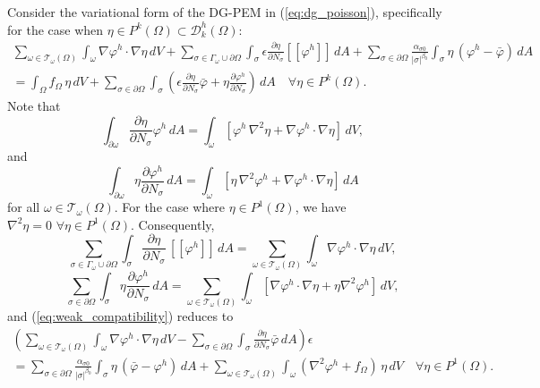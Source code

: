	Consider the variational form of the DG-PEM in (\ref{eq:dg_poisson}), specifically for the case when $\eta \in P^k (\Omega) \subset \mathcal{D}^h_k (\Omega)$:
	\begin{eqnarray}
		\sum_{\omega \in \mathcal{T}_\omega (\Omega)} \int_{\omega} \nabla \varphi^h \cdot \nabla \eta \, dV 
		+ \sum_{\sigma \in \Gamma_\omega \cup \partial \Omega} \int_{\sigma} \epsilon \frac{\partial \eta}{\partial N_{\sigma}} [\![ \varphi^h ]\!] \, dA
		+ \sum_{\sigma \in \partial \Omega} \frac{\alpha_{\sigma0}}{|\sigma|^{\beta_0}} \int_{\sigma} \eta \, (\varphi^h - \bar{\varphi}) \, dA \nonumber \\ 
		= \int_{\Omega} f_{\Omega} \, \eta \, dV + \sum_{\sigma \in \partial \Omega} \int_{\sigma} \left( \epsilon \frac{\partial \eta}{\partial N_{\sigma}} \bar{\varphi} + \eta \frac{\partial \varphi^h}{\partial N_{\sigma}} \right) \, dA \quad \forall \eta \in P^k (\Omega).
		\label{eq:weak_compatibility}
	\end{eqnarray}
Note that
\begin{equation}
	\int_{\partial \omega} \frac{\partial \eta}{\partial N_{\sigma}} \varphi^h \, dA = \int_{\omega} \left[ \varphi^h \, \nabla^2 \eta  + \nabla \varphi^h \cdot \nabla \eta \right] \, dV,
\end{equation}
and
\begin{equation}
	\int_{\partial \omega} \eta \frac{\partial \varphi^h}{\partial N_{\sigma}} \, dA = \int_{\omega} \left[ \eta \, \nabla^2 \varphi^h + \nabla \varphi^h \cdot \nabla \eta \right] \, dA
\end{equation}
for all $\omega \in \mathcal{T}_\omega (\Omega)$. For the case where $\eta \in P^1 (\Omega)$, we have $\nabla^2 \eta = 0 \, \, \forall \eta \in P^1 (\Omega)$. Consequently,
	\begin{equation}
	\sum_{\sigma \in \Gamma_\omega \cup \partial \Omega} \int_{\sigma} \frac{\partial \eta}{\partial N_{\sigma}} \, [\![ \varphi^h ]\!] \, dA = \sum_{\omega \in \mathcal{T}_\omega (\Omega)} \int_{\omega} \nabla \varphi^h \cdot \nabla \eta \, dV,
	\end{equation}
	\begin{equation}
	 \sum_{\sigma \in \partial \Omega} \int_{\sigma} \eta \frac{\partial \varphi^h}{\partial N_{\sigma}} \, dA = \sum_{\omega \in \mathcal{T}_\omega (\Omega)} \int_{\omega} \left[ \nabla \varphi^h \cdot \nabla \eta + \eta \nabla^2 \varphi^h \right] \, dV,
	\end{equation}
and (\ref{eq:weak_compatibility}) reduces to
	\begin{eqnarray}
		\left( \sum_{\omega \in \mathcal{T}_\omega (\Omega)} \int_{\omega} \nabla \varphi^h \cdot \nabla \eta \, dV
		- \sum_{\sigma \in \partial \Omega} \int_{\sigma} \frac{\partial \eta}{\partial N_{\sigma}} \bar{\varphi} \, dA \right) \epsilon \nonumber \\ 
		= \sum_{\sigma \in \partial \Omega} \frac{\alpha_{\sigma0}}{|\sigma|^{\beta_0}} \int_{\sigma} \eta \, (\bar{\varphi} - \varphi^h) \, dA + \sum_{\omega \in \mathcal{T}_\omega (\Omega)} \int_{\omega} (\nabla^2 \varphi^h + f_{\Omega}) \, \eta \, dV \quad \forall \eta \in P^1 (\Omega).
	\end{eqnarray}
	
